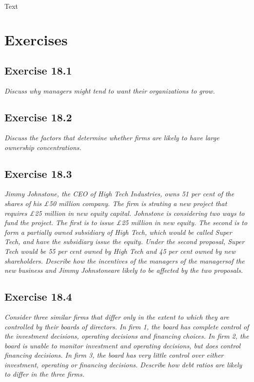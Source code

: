 \documentclass[]{book}
\theoremstyle{definition}
\theoremstyle{definition}
\theoremstyle{remark}
\begin{document}
Text

\section{Exercises}\label{exercises-18}

\subsection{Exercise 18.1}\label{exercise-18.1}

\emph{Discuss why managers might tend to want their organizations to
grow.} \citep[p.609]{book}

\subsection{Exercise 18.2}\label{exercise-18.2}

\emph{Discuss the factors that determine whether firms are likely to
have large ownership concentrations.} \citep[p.609]{book}

\subsection{Exercise 18.3}\label{exercise-18.3}

\emph{Jimmy Johnstone, the CEO of High Tech Industries, owns 51 per cent
of the shares of his £50 million company. The firm is strating a new
project that requires £25 million in new equity capital. Johnstone is
considering two ways to fund the project. The first is to issue £25
million in new equity. The second is to form a partially owned
subsidiary of High Tech, which would be called Super Tech, and have the
subsidiary issue the equity. Under the second proposal, Super Tech would
be 55 per cent owned by High Tech and 45 per cent owned by new
shareholders. Describe how the incentives of the managers of the
managersof the new business and Jimmy Johnstoneare likely to be affected
by the two proposals.} \citep[p.609]{book}

\subsection{Exercise 18.4}\label{exercise-18.4}

\emph{Consider three similar firms that differ only in the extent to
which they are controlled by their boards of directors. In firm 1, the
board has complete control of the investment decisions, operating
decisions and financing choices. In firm 2, the board is unable to
monitor investment and operating decisions, but does control financing
decisions. In firm 3, the board has very little control over either
investment, operating or financing decisions. Describe how debt ratios
are likely to differ in the three firms.} \citep[p.609]{book}
\end{document}
